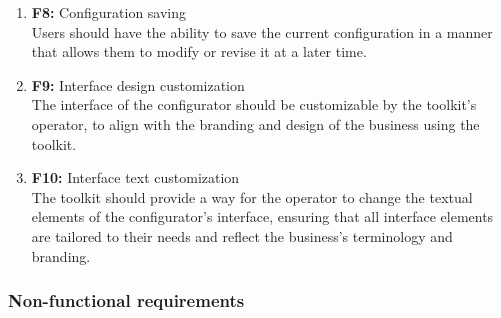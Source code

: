 \begin{enumerate}
\item \textbf{F8:} Configuration saving
\\Users should have the ability to save the current configuration in a manner that allows them to modify or revise it at a later time.

\item \textbf{F9:} Interface design customization
\\The interface of the configurator should be customizable by the toolkit's operator, to align with the branding and design of the business using the toolkit.

\item \textbf{F10:} Interface text customization
\\The toolkit should provide a way for the operator to change the textual elements of the configurator's interface, ensuring that all interface elements are tailored to their needs and reflect the business's terminology and branding.



\end{enumerate}


\subsubsection{Non-functional requirements}

